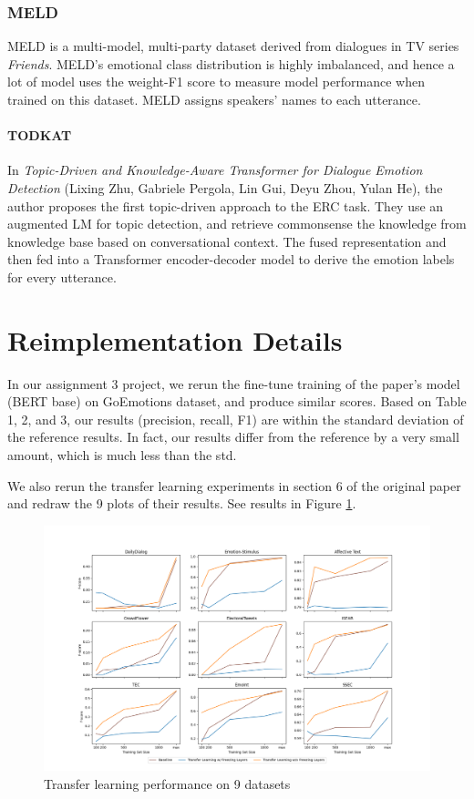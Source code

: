 \documentclass{article}
\begin{document}
\subsubsection{MELD} MELD is a multi-model, multi-party dataset derived from dialogues in TV series \textit{Friends}. MELD's emotional class distribution is highly imbalanced, and hence a lot of model uses the weight-F1 score to measure model performance when trained on this dataset. MELD assigns speakers' names to each utterance.

\paragraph{TODKAT} In \textit{Topic-Driven and Knowledge-Aware Transformer for Dialogue Emotion Detection} (Lixing Zhu, Gabriele Pergola, Lin Gui, Deyu Zhou, Yulan He), the author proposes the first topic-driven approach to the ERC task. They use an augmented LM for topic detection, and retrieve commonsense the knowledge from knowledge base based on conversational context. The fused representation and then fed into a Transformer encoder-decoder model to derive the emotion labels for every utterance. 


\section{Reimplementation Details}

In our assignment 3 project, we rerun the fine-tune training of the paper's model (BERT base) on GoEmotions dataset, and produce similar scores. Based on Table 1, 2, and 3, our results (precision, recall, F1) are within the standard deviation of the reference results. In fact, our results differ from the reference by a very small amount, which is much less than the std. 

We also rerun the transfer learning experiments in section 6 of the original paper and redraw the 9 plots of their results. See results in Figure \ref{fig:sec6}.

\begin{figure}[ht]
    \includegraphics[width=\textwidth]{section6_f1.png}
    \centering
    \caption{Transfer learning performance on 9 datasets}
    \label{fig:sec6}
\end{figure}
\end{document}
